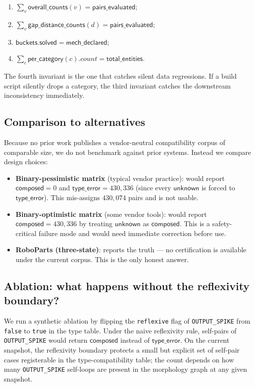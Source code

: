 \documentclass[review]{elsarticle}
\begin{document}
\begin{enumerate}[nosep]
\item $\sum_{v} \mathsf{overall\_counts}(v) = \mathsf{pairs\_evaluated}$;
\item $\sum_{v} \mathsf{gap\_distance\_counts}(d) = \mathsf{pairs\_evaluated}$;
\item $\mathsf{buckets.solved} = \mathsf{mech\_declared}$;
\item $\sum_{c} \mathsf{per\_category}(c).count = \mathsf{total\_entities}$.
\end{enumerate}

The fourth invariant is the one that catches silent data regressions.
If a build script silently drops a category, the third invariant
catches the downstream inconsistency immediately.

\subsection{Comparison to alternatives}

Because no prior work publishes a vendor-neutral compatibility corpus
of comparable size, we do not benchmark against prior systems.
Instead we compare design choices:

\begin{itemize}[nosep,leftmargin=*]
\item \textbf{Binary-pessimistic matrix} (typical vendor practice):
would report $\mathsf{composed} = 0$ and $\mathsf{type\_error}
= 430{,}336$ (since every $\mathsf{unknown}$ is forced to
$\mathsf{type\_error}$). This mis-assigns $430{,}074$ pairs and is
not usable.

\item \textbf{Binary-optimistic matrix} (some vendor tools):
would report $\mathsf{composed} = 430{,}336$ by treating
$\mathsf{unknown}$ as $\mathsf{composed}$. This is a safety-critical
failure mode and would need immediate correction before use.

\item \textbf{RoboParts (three-state)}: reports the truth — no
certification is available under the current corpus. This is the
only honest answer.
\end{itemize}

\subsection{Ablation: what happens without the reflexivity boundary?}

We run a synthetic ablation by flipping the \texttt{reflexive} flag
of \texttt{OUTPUT\_SPIKE} from \texttt{false} to \texttt{true} in
the type table. Under the naive reflexivity rule, self-pairs of
\texttt{OUTPUT\_SPIKE} would return $\mathsf{composed}$ instead of
$\mathsf{type\_error}$. On the current snapshot, the reflexivity
boundary protects a small but explicit set of self-pair cases
registerable in the type-compatibility table; the count depends on
how many \texttt{OUTPUT\_SPIKE} self-loops are present in the
morphology graph at any given snapshot.
\end{document}
